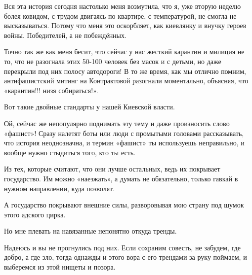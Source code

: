 Вся эта история сегодня настолько меня возмутила, что я, уже вторую неделю
болея ковидом, с трудом двигаясь по квартире, с температурой, не смогла не
высказываться. Потому что меня это оскорбляет, как киевлянку и внучку героев
войны. Победителей, а не побеждённых. 

Точно так же как меня бесит, что сейчас у нас жесткий карантин и милиция не то,
что не разогнала этих 50-100 человек без масок и с детьми, но даже перекрыли
под них полосу автодороги! В то же время, как мы отлично помним, антифашистский
митинг на Контрактовой разогнали моментально, объясняя, что «карантин!!! низя
собираться!».

Вот такие двойные стандарты у нашей Киевской власти. 

Ой, сейчас же непопулярно поднимать эту тему и даже произносить слово «фашист»!
Сразу налетят боты или люди с промытыми головами рассказывать, что история
неоднозначна, и термин «фашист» ты используешь неправильно, и вообще нужно
стыдиться того, кто ты есть.

Из тех, которые считают, что они лучше остальных, ведь их покрывает
государство. Им можно «наезжать», а думать не обязательно, только гавкай в
нужном направлении, куда позволят. 

А государство покрывают внешние силы, разворовывая мою страну под шумок этого
адского цирка. 

Но мне плевать на навязанные непонятно откуда тренды. 

Надеюсь и вы не прогнулись под них. Если сохраним совесть, не забудем, где
добро, а где зло, тогда однажды и этого вора с его трендами за руку поймаем, и
выберемся из этой нищеты и позора.
